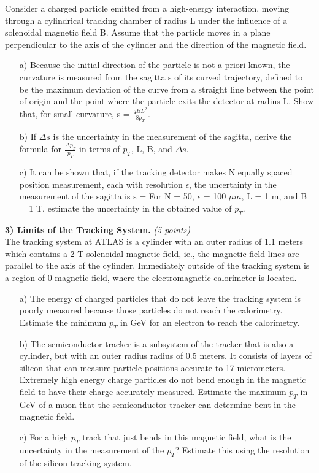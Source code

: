 {Consider a charged particle emitted from a high-energy interaction, moving through a cylindrical tracking chamber of radius L under the influence of a solenoidal magnetic field B. 
Assume that the particle moves in a plane perpendicular to the axis of the cylinder and the direction of the magnetic field.
\begin{itemize}
\item[a)]{
Because the initial direction of the particle is not a priori known, the curvature is measured from the sagitta s of its curved trajectory, defined to be the maximum deviation of the curve from a straight line between the point of origin and the point where the particle exits the detector at radius L.
Show that, for small curvature, s = $\frac{qBL^2}{8p_T}$.}
\item[b)]{
If $\Delta s$ is the uncertainty in the measurement of the sagitta, derive the formula for $\frac{\Delta p_T}{p_T}$ in terms of $p_T$, L, B, and $\Delta s$.
}
\item[c)]{
It can be shown that, if the tracking detector makes N equally spaced position measurement, each with resolution $\epsilon$, the uncertainty in the measurement of the sagitta is
\be
\Delta s = 
\ee
For N = 50, $\epsilon$ = 100 $\mu m$, L = 1 m, and B = 1 T, estimate the uncertainty in the obtained value of $p_T$.
}
\end{itemize}

\vspace*{0.25in}

\textbf{3) Limits of the Tracking System.} \hfill \textit{(5 points)}\\

The tracking system at ATLAS is a cylinder with an outer radius of 1.1 meters which contains a 2 T solenoidal magnetic field, ie., the magnetic field lines are parallel to the axis of the cylinder. 
Immediately outside of the tracking system is a region of 0 magnetic field, where the electromagnetic calorimeter is located.

\begin{itemize}
\item[a)]{
The energy of charged particles that do not leave the tracking system is poorly measured because those particles do not reach the calorimetry. 
Estimate the minimum $p_T$ in GeV for an electron to reach the calorimetry.
}

\item[b)]{
The semiconductor tracker is a subsystem of the tracker that is also a cylinder, but with an outer radius radius of 0.5 meters. 
It consists of layers of silicon that can measure particle positions accurate to 17 micrometers. 
Extremely high energy charge particles do not bend enough in the magnetic field to have their charge accurately measured. 
Estimate the maximum $p_T$ in GeV of a muon that the semiconductor tracker can determine bent in the magnetic field.
}
\item[c)]{
For a high $p_T$ track that just bends in this magnetic field, what is the uncertainty in the measurement of the $p_T$? Estimate this using the resolution of the silicon tracking system.
}
\end{itemize}

}
